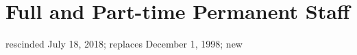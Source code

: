\section{Full and Part-time Permanent Staff}
rescinded July 18, 2018; replaces December 1, 1998; new
